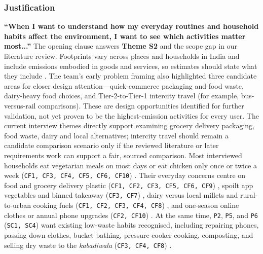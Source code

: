 \documentclass[12pt, a4paper]{article}
\begin{document}
\subsubsection{Justification}
\textbf{``When I want to understand how my everyday routines and household habits affect the environment, I want to see which activities matter most...''}
The opening clause answers \textbf{Theme S2} and the scope gap in our literature review. Footprints vary across places and households in India \cite{lee2021} and include emissions embodied in goods and services, so estimates should state what they include \cite{shi2021}. The team’s early problem framing also highlighted three candidate areas for closer design attention—quick-commerce packaging and food waste, dairy-heavy food choices, and Tier-2-to-Tier-1 intercity travel (for example, bus-versus-rail comparisons). These are design opportunities identified for further validation, not yet proven to be the highest-emission activities for every user. The current interview themes directly support examining grocery delivery packaging, food waste, dairy and local alternatives; intercity travel should remain a candidate comparison scenario only if the reviewed literature or later requirements work can support a fair, sourced comparison. Most interviewed households eat vegetarian meals on most days or eat chicken only once or twice a week (\texttt{CF1, CF3, CF4, CF5, CF6, CF10}) \cite{cf1,cf3,cf4,cf5,cf6,cf10}. Their everyday concerns centre on food and grocery delivery plastic (\texttt{CF1, CF2, CF3, CF5, CF6, CF9}) \cite{cf1,cf2,cf3,cf5,cf6,cf9}, spoilt app vegetables and binned takeaway (\texttt{CF3, CF7}) \cite{cf3,cf7}, dairy versus local millets and rural-to-urban cooking fuels (\texttt{CF1, CF2, CF3, CF4, CF8}) \cite{cf1,cf2,cf3,cf4,cf8}, and one-season online clothes or annual phone upgrades (\texttt{CF2, CF10}) \cite{cf2,cf10}. At the same time, \texttt{P2}, \texttt{P5}, and \texttt{P6} (\texttt{SC1, SC4}) want existing low-waste habits recognised, including repairing phones, passing down clothes, bucket bathing, pressure-cooker cooking, composting, and selling dry waste to the \textit{kabadiwala} (\texttt{CF3, CF4, CF8}) \cite{cf3,cf4,cf8}.
\end{document}
